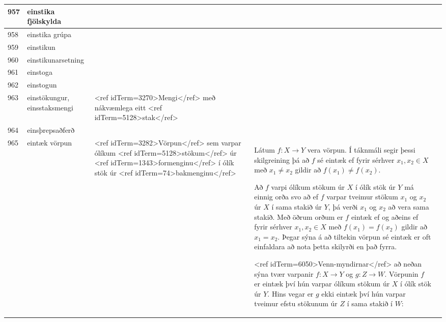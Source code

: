 \begin{longtable}{p{}|p{}|p{}|p{}|p{}}
\hline
957 & einstika fjölskylda &  &  &  \\
\hline
958 & einstika grúpa &  &  &  \\
\hline
959 & einstikun &  &  &  \\
\hline
960 & einstikunarsetning &  &  &  \\
\hline
961 & einstoga &  &  &  \\
\hline
962 & einstogun &  &  &  \\
\hline
963 & einstökungur, einsstaksmengi & <ref idTerm=3270>Mengi</ref> með nákvæmlega eitt <ref idTerm=5128>stak</ref> &  & \\
\hline
964 & einsþrepsaðferð &  &  &  \\
\hline
965 & eintæk vörpun & <ref idTerm=3282>Vörpun</ref> sem varpar ólíkum <ref idTerm=5128>stökum</ref> úr <ref idTerm=1343>formenginu</ref> í ólík stök úr <ref idTerm=74>bakmenginu</ref> & Látum $f : X \to Y$ vera vörpun. Í táknmáli segir þessi skilgreining þá að $f$ sé eintæk ef fyrir sérhver $x_1, x_2 \in X$ með $x_1 \neq x_2$ gildir að $f(x_1) \neq f(x_2)$.

Að $f$ varpi ólíkum stökum úr $X$ í ólík stök úr $Y$ má einnig orða svo að ef $f$ varpar tveimur stökum $x_1$ og $x_2$ úr $X$ í sama stakið úr $Y$, þá verði $x_1$ og $x_2$ að vera sama stakið. Með öðrum orðum er $f$ eintæk ef og aðeins ef fyrir sérhver $x_1, x_2 \in X$ með $f(x_1) = f(x_2)$ gildir að $x_1 = x_2$. Þegar sýna á að tiltekin vörpun sé eintæk er oft einfaldara að nota þetta skilyrði en það fyrra.

<ref idTerm=6050>Venn-myndirnar</ref> að neðan sýna tvær varpanir $f: X \to Y$ og $g: Z \to W$. Vörpunin $f$ er eintæk því hún varpar ólíkum stökum úr $X$ í ólík stök úr $Y$. Hins vegar er $g$ ekki eintæk því hún varpar tveimur efstu stökunum úr $Z$ í sama stakið í $W$:


\end{longtable}
